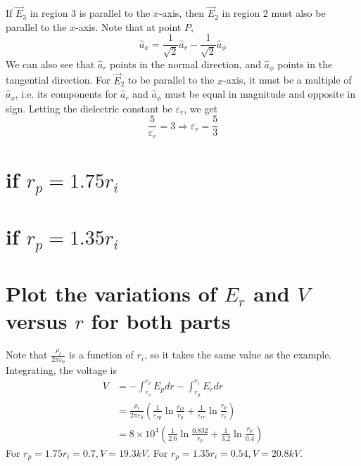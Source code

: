 \documentclass[answers]{exam}
\begin{document}
\begin{questions}
\begin{solution}
	If $\vec{E}_3$ in region 3 is parallel to the $x$-axis, then $\vec{E}_2$ in region 2 must also be parallel to the $x$-axis. Note that at point $P$,
	$$\hat{a}_x = \frac{1}{\sqrt{2}}\hat{a}_r - \frac{1}{\sqrt{2}}\hat{a}_\phi$$
	We can also see that $\hat{a}_r$ points in the normal direction, and $\hat{a}_\phi$ points in the tangential direction. For $\vec{E}_2$ to be parallel to the $x$-axis, it must be a multiple of $\hat{a}_x$, i.e. its components for $\hat{a}_r$ and $\hat{a}_\phi$ must be equal in magnitude and opposite in sign. Letting the dielectric constant be $\varepsilon_r$, we get
	$$\frac{5}{\varepsilon_r} = 3 \Rightarrow \varepsilon_r = \frac{5}{3}$$
\end{solution}


\begin{parts}
	\part{if $r_p = 1.75r_i$}
	\part{if $r_p = 1.35r_i$}
	\part{Plot the variations of $E_r$ and $V$ versus $r$ for both parts}
\end{parts}

\begin{solution}
	Note that $\frac{\rho_l}{2\pi\varepsilon_0}$ is a function of $r_i$, so it takes the same value as the example. Integrating, the voltage is
	\begin{align*}
		V &= -\int_{r_o}^{r_p}E_pdr - \int_{r_p}^{r_i}E_rdr \\
		  &= \frac{\rho_l}{2\pi\varepsilon_0}\left(\frac{1}{\varepsilon_{rp}}\ln\frac{r_O}{r_p} + \frac{1}{\varepsilon_{rr}} \ln\frac{r_p}{r_i}\right) \\
		  &= 8\times10^4\left(\frac{1}{2.6}\ln\frac{0.832}{r_p} + \frac{1}{3.2}\ln\frac{r_p}{0.4}\right)
	\end{align*}
	For $r_p = 1.75r_i = 0.7, V = 19.3\unit{kV}$. For $r_p=1.35r_i=0.54, V = 20.8\unit{kV}$.
\end{solution}


\end{questions}
\end{document}
